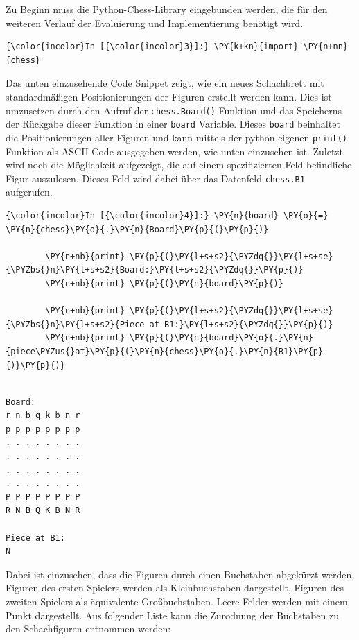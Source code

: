 Zu Beginn muss die Python-Chess-Library eingebunden werden, die für den
weiteren Verlauf der Evaluierung und Implementierung benötigt wird.

    \begin{Verbatim}[commandchars=\\\{\}]
{\color{incolor}In [{\color{incolor}3}]:} \PY{k+kn}{import} \PY{n+nn}{chess}
\end{Verbatim}


    Das unten einzusehende Code Snippet zeigt, wie ein neues Schachbrett mit
standardmäßigen Positionierungen der Figuren erstellt werden kann. Dies
ist umzusetzen durch den Aufruf der \texttt{chess.Board()} Funktion und
das Speicherns der Rückgabe dieser Funktion in einer \texttt{board}
Variable. Dieses \texttt{board} beinhaltet die Positionierungen aller
Figuren und kann mittels der python-eigenen \texttt{print()} Funktion
als ASCII Code ausgegeben werden, wie unten einzusehen ist. Zuletzt wird
noch die Möglichkeit aufgezeigt, die auf einem spezifizierten Feld
befindliche Figur auszulesen. Dieses Feld wird dabei über das Datenfeld
\texttt{chess.B1} aufgerufen.

    \begin{Verbatim}[commandchars=\\\{\}]
{\color{incolor}In [{\color{incolor}4}]:} \PY{n}{board} \PY{o}{=} \PY{n}{chess}\PY{o}{.}\PY{n}{Board}\PY{p}{(}\PY{p}{)}
            
        \PY{n+nb}{print} \PY{p}{(}\PY{l+s+s2}{\PYZdq{}}\PY{l+s+se}{\PYZbs{}n}\PY{l+s+s2}{Board:}\PY{l+s+s2}{\PYZdq{}}\PY{p}{)}
        \PY{n+nb}{print} \PY{p}{(}\PY{n}{board}\PY{p}{)}
        
        \PY{n+nb}{print} \PY{p}{(}\PY{l+s+s2}{\PYZdq{}}\PY{l+s+se}{\PYZbs{}n}\PY{l+s+s2}{Piece at B1:}\PY{l+s+s2}{\PYZdq{}}\PY{p}{)}
        \PY{n+nb}{print} \PY{p}{(}\PY{n}{board}\PY{o}{.}\PY{n}{piece\PYZus{}at}\PY{p}{(}\PY{n}{chess}\PY{o}{.}\PY{n}{B1}\PY{p}{)}\PY{p}{)}
\end{Verbatim}


    \begin{Verbatim}[commandchars=\\\{\}]

Board:
r n b q k b n r
p p p p p p p p
. . . . . . . .
. . . . . . . .
. . . . . . . .
. . . . . . . .
P P P P P P P P
R N B Q K B N R

Piece at B1:
N

    \end{Verbatim}

    Dabei ist einzusehen, dass die Figuren durch einen Buchstaben abgekürzt
werden. Figuren des ersten Spielers werden als Kleinbuchstaben
dargestellt, Figuren des zweiten Spielers als äquivalente
Großbuchstaben. Leere Felder werden mit einem Punkt dargestellt. Aus
folgender Liste kann die Zurodnung der Buchstaben zu den Schachfiguren
entnommen werden:

